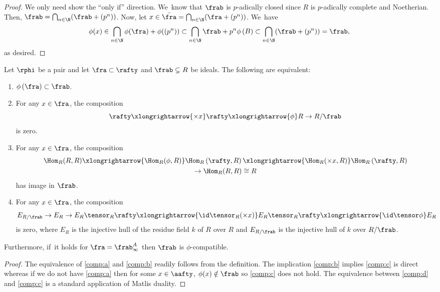 \begin{proof}
We only need show the ``only if'' direction. We~know that $\frab$ is $p$-adically closed since $R$ is $p$-adically complete and Noetherian. Then, $\frab=\bigcap_{n\in \N} (\frab+ (p^n))$. Now, let $x\in \bar{\fra} = \bigcap_{n\in \N} (\fra+ (p^n))$. We~have \[
\phi(x)\in \bigcap_{n\in \N} \phi(\fra)+\phi((p^n))\subset \bigcap_{n\in \N} \frab+p^n\phi\left(B\right) \subset \bigcap_{n\in \N} (\frab+ (p^n))=\frab,
\]
as desired.
\end{proof}

\begin{proposition}\label{comp ideal of pair injective hull}
Let $\rphi$ be a pair and let $\fra\subset \rafty$ and $\frab \subsetneq R$ be ideals. The following are equivalent:

\begin{enumerate}
\item\label{comp:a} $\phi\left(\fra\right)\subset \frab$.
\item\label{comp:b} For any $x\in \fra$, the composition\vspace*{-3pt}
\[
\rafty \xlongrightarrow{\times x} \rafty \xlongrightarrow{\phi} R \to R/\frab
\]
is zero.
\item\label{comp:c} For any $x\in \fra$, the composition\vspace*{-5pt}
\begin{multline*}
\Hom_R(R,R)\xlongrightarrow{\Hom_R(\phi,R)}\Hom_R\left(\rafty,R\right)\xlongrightarrow{\Hom_R(\times x, R)}\Hom_R\left(\rafty,R\right)\\
\to \Hom_R(R,R)\cong R
\end{multline*}
has image in $\frab$.
\item\label{comp:d}
For any $x\in \fra$, the composition\vspace*{-3pt}
\[
E_{R/\frab} \to E_R \to E_R\tensor_R \rafty \xlongrightarrow{\id\tensor_R (\times x)} E_R\tensor_R \rafty \xlongrightarrow{\id \tensor \phi} E_R
\]
is zero, where $E_R$ is the injective hull of the residue field $k$ of $R$ over $R$ and $E_{R/\frab} $ is the injective hull of $k$ over $R/\frab$.
\end{enumerate}

Furthermore, if~it holds for $\fra=\frab^A_\infty$ then $\frab$ is $\phi$-compatible.
\end{proposition}

\begin{proof}
The equivalence of \eqref{comp:a} and \eqref{comp:b} readily follows from the definition. The implication \eqref{comp:b} implies \eqref{comp:c} is direct whereas if we do not have \eqref{comp:a} then for some $x\in \aafty$, $\phi(x)\notin \frab$ so \eqref{comp:c} does not hold.
The equivalence between \eqref{comp:d} and \eqref{comp:c} is a standard application of Matlis duality.
\end{proof}

